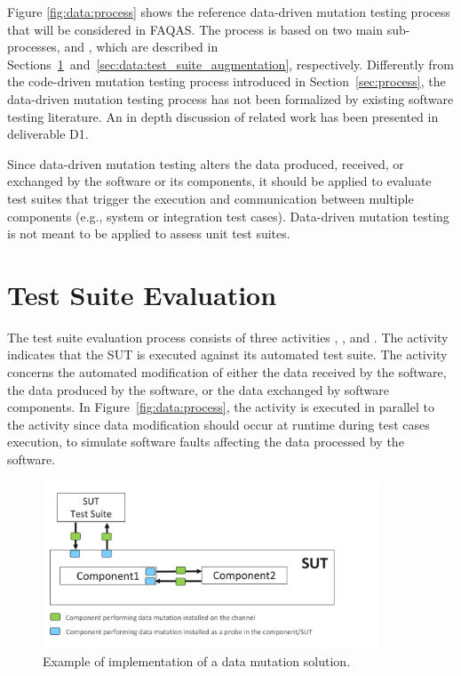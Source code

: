 Figure \ref{fig:data:process} shows the reference data-driven mutation testing process that will be considered in FAQAS. The process is based on two main sub-processes,  and , which are described in Sections~\ref{sec:data:test_suite_evaluation}~and~\ref{sec:data:test_suite_augmentation}, respectively. Differently from the code-driven mutation testing process introduced in Section~\ref{sec:process}, the data-driven mutation testing process has not been formalized by existing software testing literature. An in depth discussion of related work has been presented in deliverable D1.

Since data-driven mutation testing alters the data produced, received, or exchanged by the software or its components, it should be applied to evaluate test suites that trigger the execution and communication between multiple components (e.g., system or integration test cases). Data-driven mutation testing is not meant to be applied to assess unit test suites.

\clearpage
\section{Test Suite Evaluation} %
\label{sec:data:test_suite_evaluation}

The test suite evaluation process consists of three activities , ,  and .
The activity  indicates that the SUT is executed against its automated test suite. 
The activity  concerns the automated modification of either the data received by the software, the data produced by the software, or the data exchanged by software components.
In Figure~\ref{fig:data:process}, the activity  is executed in parallel to the activity  since data modification should occur at runtime during test cases execution, to simulate software faults affecting the data processed by the software.




\begin{figure}
	\centering
		\includegraphics[width=10cm]{images/dataMutationExample}
		\caption{Example of implementation of a data mutation solution.}
		\label{fig:data:mutateData}
	\end{figure}
	
